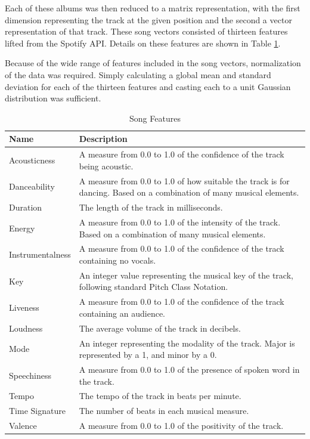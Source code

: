 \documentclass{article}
\begin{document}
Each of these albums was then reduced to a matrix representation, with the first dimension representing the track at the given position and the second a vector representation of that track. These song vectors consisted of thirteen features lifted from the Spotify API. Details on these features are shown in Table \ref{tab:features}.

Because of the wide range of features included in the song vectors, normalization of the data was required. Simply calculating a global mean and standard deviation for each of the thirteen features and casting each to a unit Gaussian distribution was sufficient.


\begin{table}
  \caption{Song Features \cite{2018Spotify}}
  \label{tab:features}
  \centering
  \begin{tabularx}{\linewidth}{lX}
    \toprule
    Name     & Description \\
    \midrule
    Acousticness & A measure from 0.0 to 1.0 of the confidence of the track being acoustic. \\
    Danceability & A measure from 0.0 to 1.0 of how suitable the track is for dancing. Based on a combination of many musical elements. \\
    Duration & The length of the track in milliseconds. \\
    Energy & A measure from 0.0 to 1.0 of the intensity of the track. Based on a combination of many musical elements. \\
    Instrumentalness & A measure from 0.0 to 1.0 of the confidence of the track containing no vocals. \\
    Key & An integer value representing the musical key of the track, following standard Pitch Class Notation. \\
    Liveness & A measure from 0.0 to 1.0 of the confidence of the track containing an audience. \\
    Loudness & The average volume of the track in decibels. \\
    Mode & An integer representing the modality of the track. Major is represented by a 1, and minor by a 0. \\
    Speechiness & A measure from 0.0 to 1.0 of the presence of spoken word in the track. \\
    Tempo & The tempo of the track in beats per minute. \\
    Time Signature & The number of beats in each musical measure. \\
    Valence & A measure from 0.0 to 1.0 of the positivity of the track. \\
    \bottomrule
  \end{tabularx}
\end{table}
\end{document}
